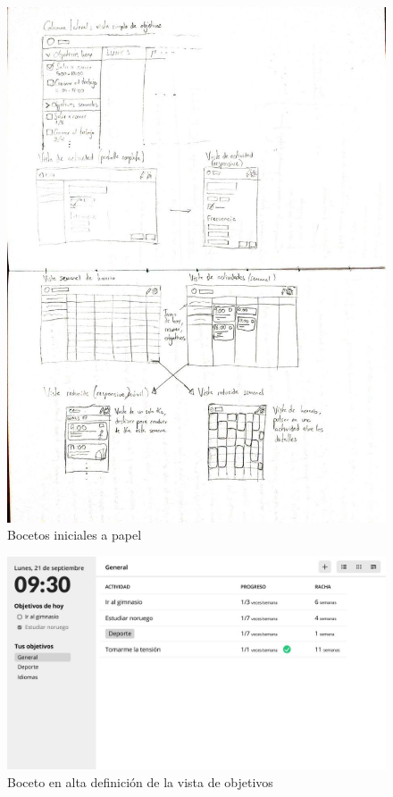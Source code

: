 \documentclass[10pt, a4paper]{aqademic}
\begin{document}
\begin{figure}[hbt!]
	\centering
	\includegraphics[scale=0.6]{img/sprint1-boceto-papel.jpg}
	\caption{Bocetos iniciales a papel}
\end{figure}

\begin{figure}[hbt!]
	\centering
	\includegraphics[scale=1.25]{img/sprint1-wireframe-objetivos.jpg}
	\caption{Boceto en alta definición de la vista de objetivos}
\end{figure}
\end{document}
